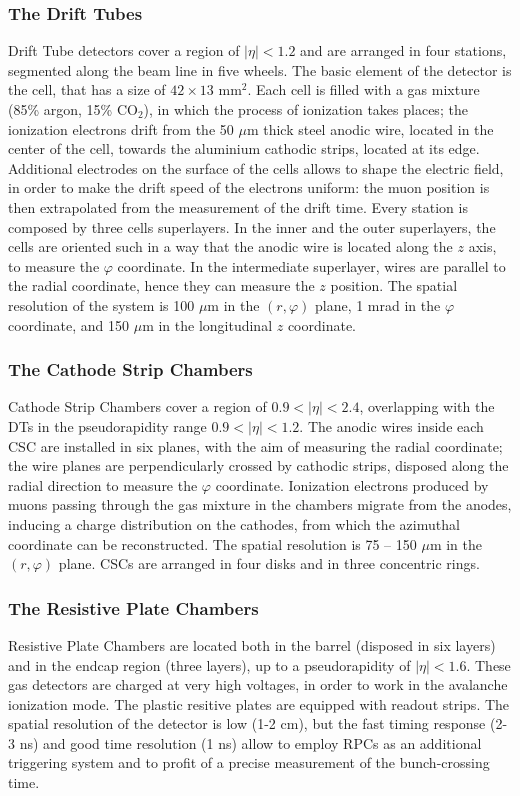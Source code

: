 \subsubsection{The Drift Tubes}
Drift Tube detectors cover a region of $|\eta|<1.2$ and are arranged in four stations, segmented along the beam line in five wheels. The basic element of the detector is the cell, that has a size of $42 \times 13 \text{ mm}^2$. Each cell is filled with a gas mixture (85\% argon, 15\% $\text{CO}_2$), in which the process of ionization takes places; the ionization electrons drift from the 50 $\mu$m thick steel anodic wire, located in the center of the cell, towards the aluminium cathodic strips, located at its edge. Additional electrodes on the surface of the cells allows to shape the electric field, in order to make the drift speed of the electrons uniform: the muon position is then extrapolated from the measurement of the drift time. Every station is composed by three cells superlayers. In the inner and the outer superlayers, the cells are oriented such in a way that the anodic wire is located along the $z$ axis, to measure the $\varphi$ coordinate. In the intermediate superlayer, wires are parallel to the radial coordinate, hence they can measure the $z$ position. The spatial resolution of the system is 100 $\mu$m in the $(r, \varphi)$ plane, 1 mrad in the $\varphi$ coordinate, and 150 $\mu$m in the longitudinal $z$ coordinate.

\subsubsection{The Cathode Strip Chambers}
Cathode Strip Chambers cover a region of $0.9<|\eta|<2.4$, overlapping with the DTs in the pseudorapidity range $0.9 < |\eta| < 1.2$. The anodic wires inside each CSC are installed in six planes, with the aim of measuring the radial coordinate; the wire planes are perpendicularly crossed by cathodic strips, disposed along the radial direction to measure the $\varphi$ coordinate. Ionization electrons produced by muons passing through the gas mixture in the chambers migrate from the anodes, inducing a charge distribution on the cathodes, from which the azimuthal coordinate can be reconstructed. The spatial resolution %
is 75 -- 150 $\mu$m in the $(r, \varphi)$ plane. CSCs are arranged in four disks and in three concentric rings.

\subsubsection{The Resistive Plate Chambers}
Resistive Plate Chambers are located both in the barrel (disposed in six layers) and in the endcap region (three layers), up to a pseudorapidity of $|\eta|<1.6$. These gas detectors are charged at very high voltages, in order to work in the avalanche ionization mode. The plastic resitive plates are equipped with readout strips. The spatial resolution of the detector is low (1-2 cm), but the fast timing response (2-3 ns) and good time resolution (1 ns) allow to employ RPCs as an additional triggering system and to profit of a precise measurement of the bunch-crossing time.

